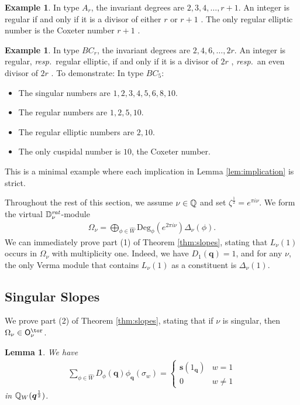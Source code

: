 \documentclass[a4paper,10pt,leqno]{amsart}
\theoremstyle{plain}
\theoremstyle{plain}
\theoremstyle{plain}
\newtheorem{lem}[thm]{Lemma}
\theoremstyle{definition}
\newtheorem{ex}[thm]{Example}
\theoremstyle{remark}
\newcommand{\Q}{\bm{q}}
\newcommand{\UDeg}{\mathrm{Deg}}
\newcommand{\rat}{\mathit{rat}}
\newcommand{\slope}{\nu}
\begin{document}
\begin{ex}
In type $A_r$, the invariant degrees are $2, 3, 4, \ldots, r + 1$.
An integer is regular if and only if it is a divisor of either $r$ or $r + 1$ \cite[\S{5.1}]{springer_1974}.
The only regular elliptic number is the Coxeter number $r + 1$ \cite[Ex.\ 1.1.2]{vv}.
\end{ex}

\begin{ex}
In type $BC_r$, the invariant degrees are $2, 4, 6, \ldots, 2r$.
An integer is regular, \emph{resp.}\ regular elliptic, if and only if it is a divisor of $2r$ \cite[\S{5.2}]{springer_1974}, \emph{resp.}\ an even divisor of $2r$ \cite[Ex.\ 1.1.2]{vv}.
To demonstrate:
In type $BC_5$:
\begin{itemize}
\item 	The singular numbers are $1, 2, 3, 4, 5, 6, 8, 10$.
\item 	The regular numbers are $1, 2, 5, 10$.
\item 	The regular elliptic numbers are $2, 10$.
\item 	The only cuspidal number is $10$, the Coxeter number.
\end{itemize}
This is a minimal example where each implication in Lemma \ref{lem:implication} is strict.
\end{ex}

Throughout the rest of this section, we assume $\slope \in \bb{Q}$ and set $\zeta^{\frac{1}{2}} = e^{\pi i\slope}$. 
We form the virtual $\bb{D}_\slope^\rat$-module
\begin{align}
\Omega_\slope = \bigoplus_{\phi \in \hat{W}} \UDeg_\phi(e^{2\pi i\slope})\Delta_\slope(\phi).
\end{align}
We can immediately prove part (1) of Theorem \ref{thm:slopes}, stating that $L_\slope(1)$ occurs in $\Omega_\slope$ with multiplicity one.
Indeed, we have $D_1(\Q) = 1$, and for any $\slope$, the only Verma module that contains $L_\slope(1)$ as a constituent is $\Delta_\slope(1)$.

\subsection{Singular Slopes}

We prove part (2) of Theorem \ref{thm:slopes}, stating that if $\slope$ is singular, then $\Omega_\slope \in \sf{O}_\slope^\tor$.

\begin{lem}\label{lem:principal-series}
We have 
\begin{align}
\sum_{\phi \in \hat{W}}
D_\phi(\Q)\phi_{\Q}(\sigma_w) = \left\{\begin{array}{ll}
\bm{s}(1_{\Q})	&w = 1\\
0				&w \neq 1
\end{array}\right.
\end{align}
in $\bb{Q}_W(\Q^{\frac{1}{2}})$.
\end{lem}
\end{document}
